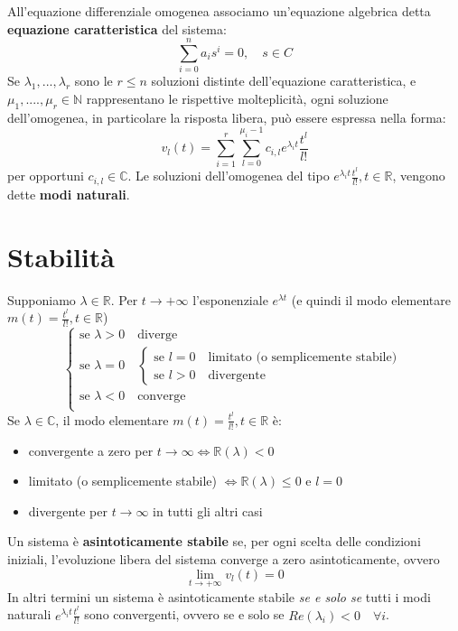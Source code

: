 \documentclass[a4paper, titlepage, oneside]{scrbook}
\begin{document}
All'equazione differenziale omogenea associamo un’equazione algebrica detta \textbf{equazione caratteristica} del sistema:
\begin{equation*}
	\sum_{i=0}^{n}a_is^i=0, \quad s \in C
\end{equation*}
Se $\lambda_1,...,\lambda_r$ sono le $r\leq n$ soluzioni distinte dell'equazione caratteristica, e $\mu_1,....,\mu_r \in \mathbb{N}$ rappresentano le rispettive molteplicità, ogni soluzione dell'omogenea, in particolare la risposta libera, può essere espressa nella forma:
\begin{equation}
	v_l(t)=\sum_{i=1}^{r}\sum_{l=0}^{\mu_i-1}c_{i,l}e^{\lambda_it}\frac{t^l}{l!}
	\label{eqn:risposta_libera}
\end{equation}
per opportuni $c_{i,l} \in \mathbb{C}$. Le soluzioni dell'omogenea del tipo $e^{\lambda_it}\frac{t^l}{l!}, t \in \mathbb{R}$, vengono dette \textbf{modi naturali}.

\section{Stabilità}
Supponiamo $\lambda \in \mathbb{R}$. Per $t\rightarrow+\infty$ l'esponenziale $e^{\lambda t}$ (e quindi il modo elementare $m(t)=\frac{t^l}{l!},t\in \mathbb{R}$)
\begin{equation*}
	\begin{cases}
		\text{se } \lambda > 0 \quad \text{diverge}\\
		\text{se } \lambda = 0 \quad
			\begin{cases}
				\text{se } l = 0 \quad \text{limitato (o semplicemente stabile)}\\
				\text{se } l > 0 \quad \text{divergente}
			\end{cases}\\
		\text{se } \lambda < 0 \quad \text{converge}\\
	\end{cases}
\end{equation*}
Se $\lambda \in \mathbb{C}$, il modo elementare $m(t)=\frac{t^l}{l!},t\in \mathbb{R}$ è:
\begin{itemize}
	\item convergente a zero per $t \rightarrow \infty \iff \mathbb{R}(\lambda) < 0$
	\item limitato (o semplicemente stabile) $\iff \mathbb{R}(\lambda)\leq0$ e $l=0$
	\item divergente per $t\rightarrow \infty$ in tutti gli altri casi
\end{itemize}
Un sistema è \textbf{asintoticamente stabile} se, per ogni scelta delle condizioni iniziali, l'evoluzione libera del sistema converge a zero asintoticamente, ovvero
$$ \lim_{t\rightarrow+\infty} v_l(t)=0 $$
In altri termini un sistema è asintoticamente stabile \textit{se e solo se} tutti i modi naturali $e^{\lambda_it}\frac{t^l}{l!}$ sono convergenti, ovvero se e solo se
$Re(\lambda_i)<0 \quad \forall i$.
\end{document}
